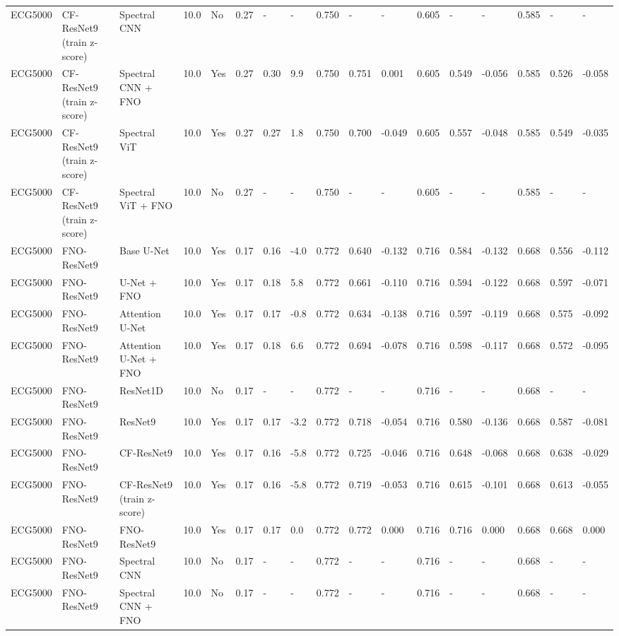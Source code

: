 \begin{longtable}{lllllllllllllllll}
ECG5000 & CF-ResNet9 (train z-score) & Spectral CNN & 10.0 & No & 0.27 & - & - & 0.750 & - & - & 0.605 & - & - & 0.585 & - & - \\
ECG5000 & CF-ResNet9 (train z-score) & Spectral CNN + FNO & 10.0 & Yes & 0.27 & 0.30 & 9.9 & 0.750 & 0.751 & 0.001 & 0.605 & 0.549 & -0.056 & 0.585 & 0.526 & -0.058 \\
ECG5000 & CF-ResNet9 (train z-score) & Spectral ViT & 10.0 & Yes & 0.27 & 0.27 & 1.8 & 0.750 & 0.700 & -0.049 & 0.605 & 0.557 & -0.048 & 0.585 & 0.549 & -0.035 \\
ECG5000 & CF-ResNet9 (train z-score) & Spectral ViT + FNO & 10.0 & No & 0.27 & - & - & 0.750 & - & - & 0.605 & - & - & 0.585 & - & - \\
ECG5000 & FNO-ResNet9 & Base U-Net & 10.0 & Yes & 0.17 & 0.16 & -4.0 & 0.772 & 0.640 & -0.132 & 0.716 & 0.584 & -0.132 & 0.668 & 0.556 & -0.112 \\
ECG5000 & FNO-ResNet9 & U-Net + FNO & 10.0 & Yes & 0.17 & 0.18 & 5.8 & 0.772 & 0.661 & -0.110 & 0.716 & 0.594 & -0.122 & 0.668 & 0.597 & -0.071 \\
ECG5000 & FNO-ResNet9 & Attention U-Net & 10.0 & Yes & 0.17 & 0.17 & -0.8 & 0.772 & 0.634 & -0.138 & 0.716 & 0.597 & -0.119 & 0.668 & 0.575 & -0.092 \\
ECG5000 & FNO-ResNet9 & Attention U-Net + FNO & 10.0 & Yes & 0.17 & 0.18 & 6.6 & 0.772 & 0.694 & -0.078 & 0.716 & 0.598 & -0.117 & 0.668 & 0.572 & -0.095 \\
ECG5000 & FNO-ResNet9 & ResNet1D & 10.0 & No & 0.17 & - & - & 0.772 & - & - & 0.716 & - & - & 0.668 & - & - \\
ECG5000 & FNO-ResNet9 & ResNet9 & 10.0 & Yes & 0.17 & 0.17 & -3.2 & 0.772 & 0.718 & -0.054 & 0.716 & 0.580 & -0.136 & 0.668 & 0.587 & -0.081 \\
ECG5000 & FNO-ResNet9 & CF-ResNet9 & 10.0 & Yes & 0.17 & 0.16 & -5.8 & 0.772 & 0.725 & -0.046 & 0.716 & 0.648 & -0.068 & 0.668 & 0.638 & -0.029 \\
ECG5000 & FNO-ResNet9 & CF-ResNet9 (train z-score) & 10.0 & Yes & 0.17 & 0.16 & -5.8 & 0.772 & 0.719 & -0.053 & 0.716 & 0.615 & -0.101 & 0.668 & 0.613 & -0.055 \\
ECG5000 & FNO-ResNet9 & FNO-ResNet9 & 10.0 & Yes & 0.17 & 0.17 & 0.0 & 0.772 & 0.772 & 0.000 & 0.716 & 0.716 & 0.000 & 0.668 & 0.668 & 0.000 \\
ECG5000 & FNO-ResNet9 & Spectral CNN & 10.0 & No & 0.17 & - & - & 0.772 & - & - & 0.716 & - & - & 0.668 & - & - \\
ECG5000 & FNO-ResNet9 & Spectral CNN + FNO & 10.0 & No & 0.17 & - & - & 0.772 & - & - & 0.716 & - & - & 0.668 & - & - \\

\end{longtable}
